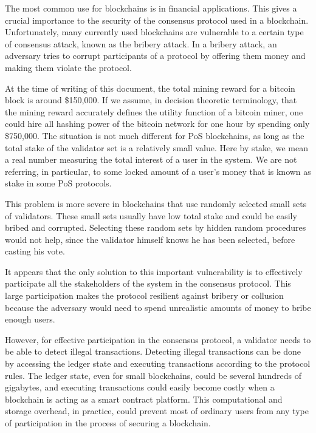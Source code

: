The most common use for blockchains is in financial applications. This gives a crucial importance to the
security of the consensus protocol used in a blockchain. Unfortunately, many currently used blockchains are
vulnerable to a certain type of consensus attack, known as the bribery attack. In a bribery attack, an adversary
tries to corrupt participants of a protocol by offering them money and making them violate the protocol.

At the time of writing of this document,
the total mining reward for a bitcoin block is around \$150,000. If we assume, in decision theoretic terminology,
that the mining reward accurately defines the utility function of a bitcoin miner, one could hire all hashing power
of the bitcoin network for one hour by
spending only \$750,000. The situation is not much different for PoS blockchains, as long as the total
stake of the validator set is a relatively small value. Here by
stake, we mean a real number measuring the total interest of a user in the system. We are not referring, in
particular, to some locked amount of a user's money that is known as stake in some PoS protocols.

This problem is more severe in blockchains that use randomly selected small sets of validators. These small sets
usually have low total stake and could be easily bribed and corrupted. Selecting these random sets
by hidden random procedures would not help, since the validator himself knows he has been selected, before casting
his vote.

It appears that the only solution to this important vulnerability is to effectively participate all the stakeholders
of the system in the consensus protocol. This large participation makes the protocol resilient against bribery or
collusion because the adversary would need to spend unrealistic amounts of money to bribe enough users.

However, for effective participation in the consensus protocol, a validator needs to be able to detect
illegal transactions. Detecting illegal transactions can be done by accessing the ledger
state and executing transactions according to the protocol rules. The
ledger state, even for small blockchains, could be several
hundreds of gigabytes, and executing transactions could easily become costly when a blockchain is acting as a
smart contract platform. This computational and storage overhead, in practice, could prevent most of
ordinary users from any type of participation in the process of securing a blockchain.

